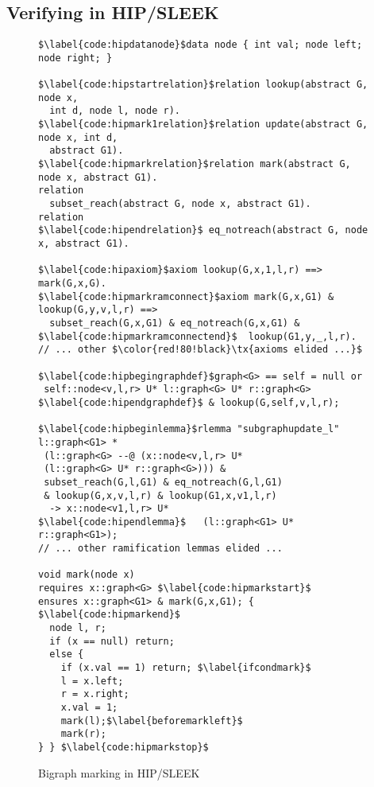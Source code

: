 \subsection{Verifying  in HIP/SLEEK}
\label{sec:hipsleek} %
\label{sec:hipsleekmark}

\begin{figure}[t]
  \begin{lstlisting}
$\label{code:hipdatanode}$data node { int val; node left; node right; }

$\label{code:hipstartrelation}$relation lookup(abstract G, node x,
  int d, node l, node r).
$\label{code:hipmark1relation}$relation update(abstract G, node x, int d,
  abstract G1).
$\label{code:hipmarkrelation}$relation mark(abstract G, node x, abstract G1).
relation
  subset_reach(abstract G, node x, abstract G1).
relation
$\label{code:hipendrelation}$ eq_notreach(abstract G, node x, abstract G1).

$\label{code:hipaxiom}$axiom lookup(G,x,1,l,r) ==> mark(G,x,G).
$\label{code:hipmarkramconnect}$axiom mark(G,x,G1) & lookup(G,y,v,l,r) ==>
  subset_reach(G,x,G1) & eq_notreach(G,x,G1) &
$\label{code:hipmarkramconnectend}$  lookup(G1,y,_,l,r).
// ... other $\color{red!80!black}\tx{axioms elided ...}$

$\label{code:hipbegingraphdef}$graph<G> == self = null or
 self::node<v,l,r> U* l::graph<G> U* r::graph<G>
$\label{code:hipendgraphdef}$ & lookup(G,self,v,l,r);

$\label{code:hipbeginlemma}$rlemma "subgraphupdate_l" l::graph<G1> *
 (l::graph<G> --@ (x::node<v,l,r> U*
 (l::graph<G> U* r::graph<G>))) &
 subset_reach(G,l,G1) & eq_notreach(G,l,G1)
 & lookup(G,x,v,l,r) & lookup(G1,x,v1,l,r)
  -> x::node<v1,l,r> U*
$\label{code:hipendlemma}$   (l::graph<G1> U* r::graph<G1>);
// ... other ramification lemmas elided ...

void mark(node x)
requires x::graph<G> $\label{code:hipmarkstart}$
ensures x::graph<G1> & mark(G,x,G1); { $\label{code:hipmarkend}$
  node l, r;
  if (x == null) return;
  else {
    if (x.val == 1) return; $\label{ifcondmark}$
    l = x.left;
    r = x.right;
    x.val = 1;
    mark(l);$\label{beforemarkleft}$
    mark(r);
} } $\label{code:hipmarkstop}$
\end{lstlisting}
\caption{Bigraph marking in HIP/SLEEK}
\label{fig:hipmarkgraph}
\end{figure}

